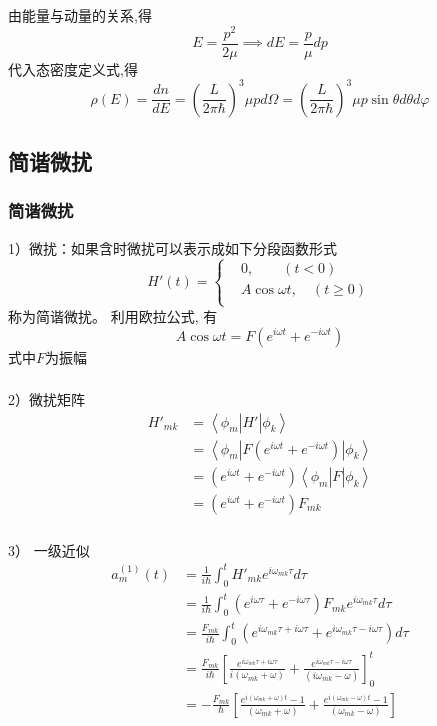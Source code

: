 \begin{frame} 
  \frametitle{}
由能量与动量的关系,得
\[E = \frac{p^2}{2\mu} \implies dE = \frac{p}{\mu} d p \]
代入态密度定义式,得
\[ \rho(E) = \frac{dn}{dE} = (\frac{L}{2\pi \hbar})^3 \mu p d\Omega = (\frac{L}{2\pi \hbar})^3 \mu p \sin\theta d\theta d\varphi \]
\end{frame} 

\subsection{简谐微扰}

\begin{frame} 
  \frametitle{简谐微扰}
  1）微扰：如果含时微扰可以表示成如下分段函数形式
  \[ H'(t) = \left\{
    \begin{aligned}
     &0, \qquad (t<0)\\
     &A\cos \omega t , \quad (t \ge 0) \\
    \end{aligned}\right. \]
  称为简谐微扰。 利用欧拉公式, 有
  \[ A\cos \omega t = F(e^ {i \omega t} + e^ {-i \omega t}) \]
  式中$F$为振幅
  \end{frame} 

  \begin{frame} 
    \frametitle{}
  2）微扰矩阵 
  \[
    \begin{aligned}
      H'_{mk} &=  \left\langle \phi _m  \right\vert H'  \left\vert \phi _k   \right\rangle \\ 
      &= \left\langle \phi _m  \right\vert F(e^ {i \omega t} + e^ {-i \omega t})   \left\vert \phi _k   \right\rangle  \\
      &= (e^ {i \omega t} + e^ {-i \omega t}) \left\langle \phi _m  \right\vert F \left\vert \phi _k   \right\rangle  \\
      &= (e^ {i \omega t} + e^ {-i \omega t}) F_{mk}
    \end{aligned}
    \]
  \end{frame} 

  \begin{frame} 
    \frametitle{}
   3） 一级近似
   \[   \begin{aligned}
    a^{(1)}_m(t) 
    &= \frac{1}{i\hbar}\int_{0}^{t} H'_{mk}  e^{i \omega _{mk} \tau} d\tau \\
    &= \frac{1}{i\hbar}\int_{0}^{t} (e^ {i \omega \tau} + e^ {-i \omega \tau}) F_{mk}  e^{i \omega _{mk} \tau} d\tau \\
    &= \frac{F_{mk} }{i\hbar} \int_{0}^{t} (e^ { i \omega _{mk} \tau+i \omega \tau} + e^ {i \omega _{mk} \tau -i \omega \tau})   d\tau \\
    &= \frac{F_{mk} }{i\hbar}  \left[\frac{e^ { i \omega _{mk} \tau+i \omega \tau}}{i(\omega _{mk}+ \omega)} + \frac{e^ { i \omega _{mk} \tau - i \omega \tau}}{(i\omega _{mk}- \omega)} \right]^t _{0}\\
    &= - \frac{F_{mk} }{\hbar} \left[\frac{e^ { i (\omega _{mk} + \omega) t} -1 }{(\omega _{mk}+ \omega)} + \frac{e^ { i(\omega _{mk}  - \omega) t} -1}{(\omega _{mk}-  \omega)} \right]
 \end{aligned}
 \]
  \end{frame} 

